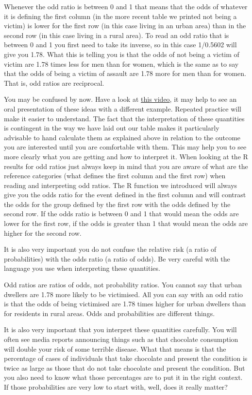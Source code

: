 \documentclass[
]{book}
\begin{document}
Whenever the odd ratio is between 0 and 1 that means that the odds of whatever it is defining the first column (in the more recent table we printed not being a victim) is lower for the first row (in this case living in an urban area) than in the second row (in this case living in a rural area). To read an odd ratio that is between 0 and 1 you first need to take its inverse, so in this case 1/0.5602 will give you 1.78. What this is telling you is that the odds of not being a victim of victim are 1.78 times less for men than for women, which is the same as to say that the odds of being a victim of assault are 1.78 more for men than for women. That is, odd ratios are reciprocal.

You may be confused by now. Have a look at \href{https://www.youtube.com/watch?v=nFHL54yOniI}{this video}, it may help to see an oral presentation of these ideas with a different example. Repeated practice will make it easier to understand. The fact that the interpretation of these quantities is contingent in the way we have laid out our table makes it particularly advisable to hand calculate them as explained above in relation to the outcome you are interested until you are comfortable with them. This may help you to see more clearly what you are getting and how to interpret it. When looking at the R results for odd ratios just always keep in mind that you are aware of what are the reference categories (what defines the first column and the first row) when reading and interpreting odd ratios. The R function we introduced will always give you the odds ratio for the event defined in the first column and will contrast the odds for the group defined by the first row with the odds defined by the second row. If the odds ratio is between 0 and 1 that would mean the odds are lower for the first row, if the odds is greater than 1 that would mean the odds are higher for the second row.

It is also very important you do not confuse the relative risk (a ratio of probabilities) with the odds ratio (a ratio of odds). Be very careful with the language you use when interpreting these quantities.

Odd ratios are ratios of odds, not probability ratios. You cannot say that urban dwellers are 1.78 more likely to be victimised. All you can say with an odd ratio is that the odds of being victimised are 1.78 times higher for urban dwellers than for residents in rural areas. Odds and probabilities are different things.

It is also very important that you interpret these quantities carefully. You will often see media reports announcing things such as that chocolate consumption will double your risk of some terrible disease. What that means is that the percentage of cases of individuals that take chocolate and present the condition is twice as large as those that do not take chocolate and present the condition. But you also need to know what those percentages are to put it in the right context. If those probabilities are very low to start with, well, does it really matter?
\end{document}

